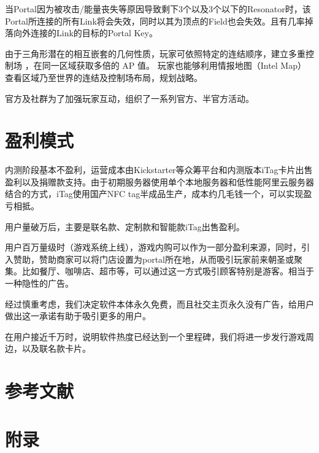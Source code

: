 \documentclass[UTF8]{ctexart}
\begin{document}
\begin{tcolorbox}[breakable]
    当Portal因为被攻击/能量丧失等原因导致剩下3个以及3个以下的Resonator时，该Portal所连接的所有Link将会失效，同时以其为顶点的Field也会失效。且有几率掉落向外连接的Link的目标的Portal Key。

    由于三角形潜在的相互嵌套的几何性质，玩家可依照特定的连结顺序，建立多重控制场 ，在同一区域获取多倍的 AP 值。 玩家也能够利用情报地图（Intel Map）查看区域乃至世界的连结及控制场布局，规划战略。\cite{wiki:Ingress}
\end{tcolorbox}


官方及社群为了加强玩家互动，组织了一系列官方、半官方活动。

\section{盈利模式}

内测阶段基本不盈利，运营成本由Kickstarter等众筹平台和内测版本iTag卡片出售盈利以及捐赠款支持。由于初期服务器使用单个本地服务器和低性能阿里云服务器结合的方式，iTag使用国产NFC tag半成品生产，成本约几毛钱一个，可以实现盈亏相抵。

用户量破万后，主要是联名款、定制款和智能款iTag出售盈利。

用户百万量级时（游戏系统上线），游戏内购可以作为一部分盈利来源，同时，引入赞助，赞助商家可以将门店设置为portal所在地，从而吸引玩家前来朝圣或聚集。比如餐厅、咖啡店、超市等，可以通过这一方式吸引顾客特别是游客。相当于一种隐性的广告。

经过慎重考虑，我们决定软件本体永久免费，而且社交主页永久没有广告，给用户做出这一承诺有助于吸引更多的用户。

在用户接近千万时，说明软件热度已经达到一个里程碑，我们将进一步发行游戏周边，以及联名款卡片。

\section{参考文献}




\newpage
\section{附录}
\end{document}
